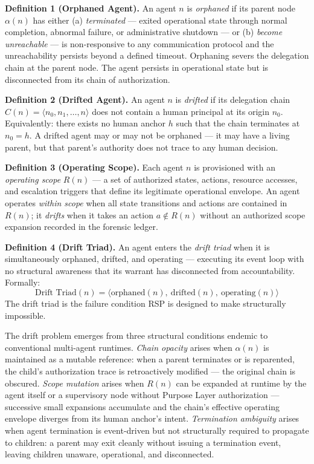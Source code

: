\medskip
\noindent\textbf{Definition 1 (Orphaned Agent).} An agent $n$ is \emph{orphaned} if its parent node $\alpha(n)$ has either (a) \emph{terminated} — exited operational state through normal completion, abnormal failure, or administrative shutdown — or (b) \emph{become unreachable} — is non-responsive to any communication protocol and the unreachability persists beyond a defined timeout. Orphaning severs the delegation chain at the parent node. The agent persists in operational state but is disconnected from its chain of authorization.

\medskip
\noindent\textbf{Definition 2 (Drifted Agent).} An agent $n$ is \emph{drifted} if its delegation chain $C(n) = \langle n_0, n_1, \ldots, n \rangle$ does not contain a human principal at its origin $n_0$. Equivalently: there exists no human anchor $h$ such that the chain terminates at $n_0 = h$. A drifted agent may or may not be orphaned — it may have a living parent, but that parent's authority does not trace to any human decision.

\medskip
\noindent\textbf{Definition 3 (Operating Scope).} Each agent $n$ is provisioned with an \emph{operating scope} $R(n)$ — a set of authorized states, actions, resource accesses, and escalation triggers that define its legitimate operational envelope. An agent operates \emph{within scope} when all state transitions and actions are contained in $R(n)$; it \emph{drifts} when it takes an action $a \notin R(n)$ without an authorized scope expansion recorded in the forensic ledger.

\medskip
\noindent\textbf{Definition 4 (Drift Triad).} An agent enters the \emph{drift triad} when it is simultaneously orphaned, drifted, and operating — executing its event loop with no structural awareness that its warrant has disconnected from accountability. Formally:
\begin{equation}
\text{Drift Triad}(n) = \bigl\langle \text{orphaned}(n),\ \text{drifted}(n),\ \text{operating}(n) \bigr\rangle
\label{eq:intro-drift-triad}
\end{equation}
The drift triad is the failure condition RSP is designed to make structurally impossible.

The drift problem emerges from three structural conditions endemic to conventional multi-agent runtimes. \emph{Chain opacity} arises when $\alpha(n)$ is maintained as a mutable reference: when a parent terminates or is reparented, the child's authorization trace is retroactively modified — the original chain is obscured. \emph{Scope mutation} arises when $R(n)$ can be expanded at runtime by the agent itself or a supervisory node without Purpose Layer authorization — successive small expansions accumulate and the chain's effective operating envelope diverges from its human anchor's intent. \emph{Termination ambiguity} arises when agent termination is event-driven but not structurally required to propagate to children: a parent may exit cleanly without issuing a termination event, leaving children unaware, operational, and disconnected.


